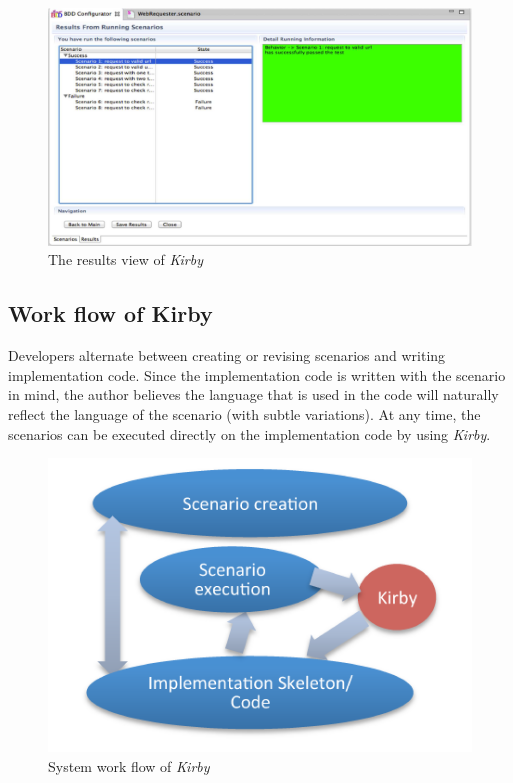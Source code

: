 \documentclass[conference, onecolumn, a4, 12pt]{IEEEtran}
\begin{document}
\begin{figure}
	\centering
	\includegraphics[width=0.7\linewidth]{Results_view_of_kirby}
	\caption{The results view of \textit{Kirby}}
	\label{fig:resultsviewofkirby}
\end{figure}

\subsection{Work flow of Kirby}
Developers alternate between creating or revising scenarios and writing implementation code. Since the implementation code is written with the scenario in mind, the author believes the language that is used in the code will naturally reflect the language of the scenario (with subtle variations). At any time, the scenarios can be executed directly on the implementation code by using \textit{Kirby}.

\begin{figure}
	\centering
	\includegraphics[width=0.7\linewidth]{System_workflow_kirby}
	\caption{System work flow of \textit{Kirby}}
	\label{fig:systemworkflowkirby}
\end{figure}
\end{document}
